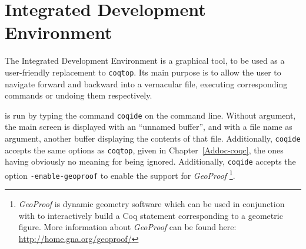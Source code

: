 \chapter[\Coq{} Integrated Development Environment]{\Coq{} Integrated Development Environment\label{Addoc-coqide}
}

The \Coq{} Integrated Development Environment is a graphical tool, to
be used as a user-friendly replacement to \texttt{coqtop}. Its main
purpose is to allow the user to navigate forward and backward into a
\Coq{} vernacular file, executing corresponding commands or undoing
them respectively. %

\CoqIDE{} is run by typing the command \verb|coqide| on the command
line. Without argument, the main screen is displayed with an ``unnamed
buffer'', and with a file name as argument, another buffer displaying
the contents of that file. Additionally, \verb|coqide| accepts the same
options as \verb|coqtop|, given in Chapter~\ref{Addoc-coqc}, the ones having
obviously no meaning for \CoqIDE{} being ignored. Additionally, \verb|coqide| accepts the option \verb|-enable-geoproof| to enable the support for \emph{GeoProof} \footnote{\emph{GeoProof} is dynamic geometry software which can be used in conjunction with \CoqIDE{} to interactively build a Coq statement corresponding to a geometric figure. More information about \emph{GeoProof} can be found here: \url{http://home.gna.org/geoproof/} }. 
  

